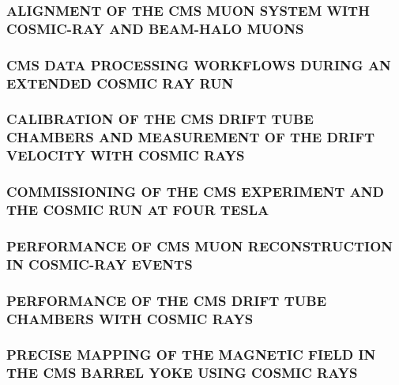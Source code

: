 \documentclass[a4paper, 11pt, twoside, openright]{report}
\begin{document}
\subsubsection{ALIGNMENT OF THE CMS MUON SYSTEM WITH COSMIC-RAY AND BEAM-HALO MUONS}

\subsubsection{CMS DATA PROCESSING WORKFLOWS DURING AN EXTENDED COSMIC RAY RUN}

\subsubsection{CALIBRATION OF THE CMS DRIFT TUBE CHAMBERS AND MEASUREMENT OF THE DRIFT VELOCITY WITH COSMIC RAYS}

\subsubsection{COMMISSIONING OF THE CMS EXPERIMENT AND THE COSMIC RUN AT FOUR TESLA}

\subsubsection{PERFORMANCE OF CMS MUON RECONSTRUCTION IN COSMIC-RAY EVENTS}

\subsubsection{PERFORMANCE OF THE CMS DRIFT TUBE CHAMBERS WITH COSMIC RAYS}

\subsubsection{PRECISE MAPPING OF THE MAGNETIC FIELD IN THE CMS BARREL YOKE USING COSMIC RAYS}

\end{document}
